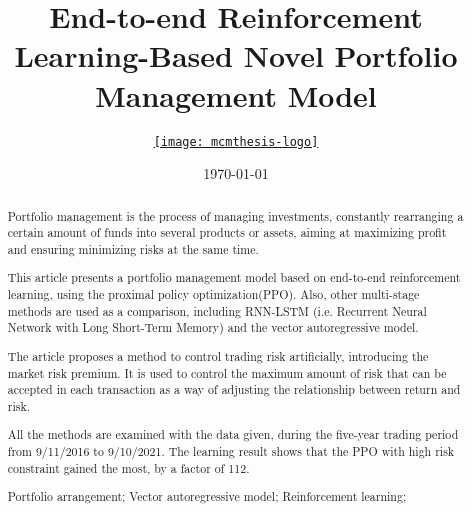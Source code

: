\documentclass{mcmthesis}
\title{End-to-end Reinforcement Learning-Based Novel Portfolio Management Model}
\author{\small \href{MCM 2022 Team 2207690}
  {\texttt{[image: mcmthesis-logo]}}}
\date{\today}
\begin{document}
\begin{abstract}





Portfolio management is the process of managing investments,
constantly rearranging a certain amount of funds into several products or assets,
aiming at maximizing profit and ensuring minimizing risks at the same time.

This article presents a portfolio management model based on end-to-end reinforcement learning, using the proximal policy optimization(PPO).
Also, other multi-stage methods are used as a comparison, including RNN-LSTM (i.e. Recurrent Neural Network with Long Short-Term Memory) and the vector autoregressive model.

The article proposes a method to control trading risk artificially, introducing the market risk premium.
It is used to control the maximum amount of risk that can be accepted in each transaction as a way of adjusting the relationship between return and risk.

All the methods are examined with the data given, during the five-year trading period from 9/11/2016 to 9/10/2021.
The learning result shows that the PPO with high risk constraint gained the most, by a factor of 112.

\begin{keywords}
Portfolio arrangement; Vector autoregressive model; Reinforcement learning;
\end{keywords}
\end{abstract}
\maketitle

\tableofcontents
\newpage
\end{document}
